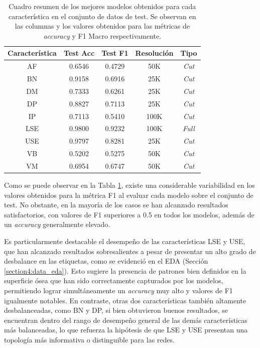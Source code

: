 \begin{table}[h]
    \centering
    \begin{tabular}{|c|c|c|c|c|}
    \hline
    \rowcolor[HTML]{D33333} 
    {\color[HTML]{FFFFFF} \textbf{Característica}} & {\color[HTML]{FFFFFF} \textbf{Test Acc}} & {\color[HTML]{FFFFFF} \textbf{Test F1}} & {\color[HTML]{FFFFFF} \textbf{Resolución}} & {\color[HTML]{FFFFFF} \textbf{Tipo}} \\ \hline
    AF & 0.6546 & 0.4729 & 50K & \textit{Cut} \\
    BN & 0.9158 & 0.6916 & 25K & \textit{Cut} \\
    DM & 0.7333 & 0.6261 & 25K & \textit{Cut} \\
    DP & 0.8827 & 0.7113 & 25K & \textit{Cut} \\
    IP & 0.7113 & 0.5410 & 100K & \textit{Cut} \\
    LSE & 0.9800 & 0.9232 & 100K & \textit{Full} \\
    USE & 0.9797 & 0.8281 & 25K & \textit{Cut} \\
    VB & 0.5202 & 0.5275 & 50K & \textit{Cut} \\
    VM & 0.6954 & 0.6747 & 50K & \textit{Cut} \\ \hline
    \end{tabular}
    \caption[Cuadro resumen de los mejores modelos obtenidos para cada característica]{Cuadro resumen de los mejores modelos obtenidos para cada característica en el conjunto de datos de test. Se observan en las columnas  y  los valores obtenidos para las métricas de \textit{accuracy} y F1 Macro respectivamente.}
    \label{table5:single_tag__results}
\end{table}

Como se puede observar en la Tabla \ref{table5:single_tag__results}, existe una considerable variabilidad en los valores obtenidos para la métrica F1 al evaluar cada modelo sobre el conjunto de test. No obstante, en la mayoría de los casos se han alcanzado resultados satisfactorios, con valores de F1 superiores a 0.5 en todos los modelos, además de un \textit{accuracy} generalmente elevado.

Es particularmente destacable el desempeño de las características LSE y USE, que han alcanzado resultados sobresalientes a pesar de presentar un alto grado de desbalance en las etiquetas, como se evidenció en el EDA (Sección \ref{section4:data_eda}). Esto sugiere la presencia de patrones bien definidos en la superficie ósea que han sido correctamente capturados por los modelos, permitiendo lograr simultáneamente un \textit{accuracy} muy alto y valores de F1 igualmente notables. En contraste, otras dos características también altamente desbalanceadas, como BN y DP, si bien obtuvieron buenos resultados, se encuentran dentro del rango de desempeño general de las demás características más balanceadas, lo que refuerza la hipótesis de que LSE y USE presentan una topología más informativa o distinguible para las redes.

